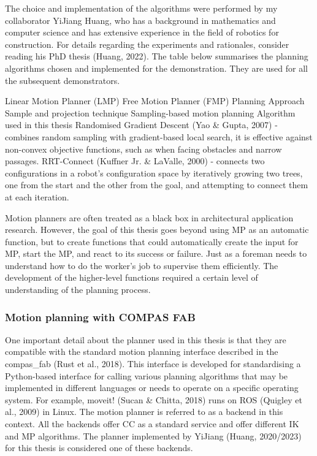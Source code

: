 The choice and implementation of the algorithms were performed by my collaborator YiJiang Huang, who has a background in mathematics and computer science and has extensive experience in the field of robotics for construction. For details regarding the experiments and rationales, consider reading his PhD thesis (Huang, 2022). The table below summarises the planning algorithms chosen and implemented for the demonstration. They are used for all the subsequent demonstrators.

Linear Motion Planner (LMP)
Free Motion Planner (FMP)
Planning Approach
Sample and projection technique
Sampling-based motion planning
Algorithm used in this thesis
Randomised Gradient Descent (Yao & Gupta, 2007) - combines random sampling with gradient-based local search, it is effective against non-convex objective functions, such as when facing obstacles and narrow passages.
RRT-Connect (Kuffner Jr. & LaValle, 2000) - connects two configurations in a robot's configuration space by iteratively growing two trees, one from the start and the other from the goal, and attempting to connect them at each iteration.

Motion planners are often treated as a black box in architectural application research. However, the goal of this thesis goes beyond using MP as an automatic function, but to create functions that could automatically create the input for MP, start the MP, and react to its success or failure. Just as a foreman needs to understand how to do the worker’s job to supervise them efficiently. The development of the higher-level functions required a certain level of understanding of the planning process.

\subsubsection{Motion planning with COMPAS FAB}


One important detail about the planner used in this thesis is that they are compatible with the standard motion planning interface described in the compas_fab (Rust et al., 2018). This interface is developed for standardising a Python-based interface for calling various planning algorithms that may be implemented in different languages or needs to operate on a specific operating system. For example, moveit! (Sucan & Chitta, 2018) runs on ROS (Quigley et al., 2009) in Linux. The motion planner is referred to as a backend in this context. All the backends offer CC as a standard service and offer different IK and MP algorithms. The planner implemented by YiJiang (Huang, 2020/2023) for this thesis is considered one of these backends. 


